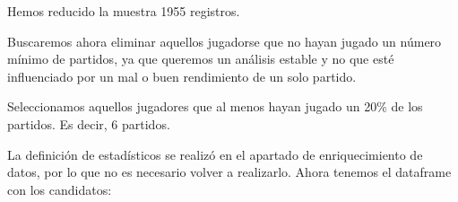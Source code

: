 \documentclass[
]{article}
\newenvironment{Shaded}{\begin{snugshade}}{\end{snugshade}}
\newcommand{\DecValTok}[1]{\textcolor[rgb]{0.00,0.00,0.81}{#1}}
\newcommand{\KeywordTok}[1]{\textcolor[rgb]{0.13,0.29,0.53}{\textbf{#1}}}
\newcommand{\NormalTok}[1]{#1}
\newcommand{\OperatorTok}[1]{\textcolor[rgb]{0.81,0.36,0.00}{\textbf{#1}}}
\newcommand{\StringTok}[1]{\textcolor[rgb]{0.31,0.60,0.02}{#1}}
\begin{document}
\begin{Shaded}
\end{Shaded}

Hemos reducido la muestra 1955 registros.

Buscaremos ahora eliminar aquellos jugadorse que no hayan jugado un
número mínimo de partidos, ya que queremos un análisis estable y no que
esté influenciado por un mal o buen rendimiento de un solo partido.

Seleccionamos aquellos jugadores que al menos hayan jugado un 20\% de
los partidos. Es decir, 6 partidos.

\begin{Shaded}
\end{Shaded}

La definición de estadísticos se realizó en el apartado de
enriquecimiento de datos, por lo que no es necesario volver a
realizarlo. Ahora tenemos el dataframe con los candidatos:
\end{document}
